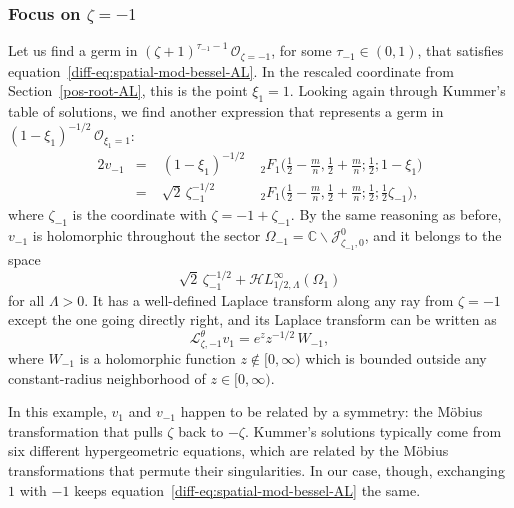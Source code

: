 \documentclass{article}
\newcommand{\singexp}[2]{\mathcal{H}L^\infty_{#1, #2}}
\newcommand{\C}{\mathbb{C}}
\newcommand{\laplace}{\mathcal{L}}
\theoremstyle{definition}
\theoremstyle{plain}
\begin{document}
\subsubsection{Focus on $\zeta = -1$}\label{neg-root-AL}
%
Let us find a germ in $(\zeta+1)^{\tau_{-1}-1}\,\mathcal{O}_{\zeta=-1}$, for some $\tau_{-1} \in (0, 1)$, that satisfies equation~\eqref{diff-eq:spatial-mod-bessel-AL}. In the rescaled coordinate from Section~\ref{pos-root-AL}, this is the point $\xi_1 = 1$. Looking again through Kummer's table of solutions, we find another expression \cite[formula~15.10.14]{dlmf} that represents a germ in $(1-\xi_1)^{-1/2}\,\mathcal{O}_{\xi_1=1}$:
\begin{alignat*}{2}
v_{-1} &=\;& (1-\xi_1)^{-1/2} &\;{}_2F_1\big(\tfrac{1}{2}-\tfrac{m}{n}, \tfrac{1}{2}+\tfrac{m}{n}; \tfrac{1}{2}; 1-\xi_1\big) \\[1mm]
&=\;& \sqrt{2}\,\zeta_{-1}^{-1/2} &\;{}_2F_1\big(\tfrac{1}{2}-\tfrac{m}{n}, \tfrac{1}{2}+\tfrac{m}{n}; \tfrac{1}{2}; \tfrac{1}{2}\zeta_{-1}\big),
\end{alignat*}
where $\zeta_{-1}$ is the coordinate with $\zeta = -1 + \zeta_{-1}$. By the same reasoning as before, $v_{-1}$ is holomorphic throughout the sector $\Omega_{-1} = \C \smallsetminus \mathcal{J}^0_{\zeta_{-1}, 0}$, and it belongs to the space
\[ \sqrt{2}\,\zeta_{-1}^{-1/2} + \singexp{1/2}{\Lambda}(\Omega_1) \]
for all $\Lambda > 0$. It has a well-defined Laplace transform along any ray from $\zeta = -1$ except the one going directly right, and its Laplace transform can be written as
\[ \laplace^\theta_{\zeta, -1} v_1 = e^z z^{-1/2}\,W_{-1}, \]
where $W_{-1}$ is a holomorphic function $z \notin [0, \infty)$ which is bounded outside any constant-radius neighborhood of $z \in [0, \infty)$.


In this example, $v_1$ and $v_{-1}$ happen to be related by a symmetry: the M\"{o}bius transformation that pulls $\zeta$ back to $-\zeta$. Kummer's solutions typically come from six different hypergeometric equations, which are related by the M\"{o}bius transformations that permute their singularities. In our case, though, exchanging $1$ with $-1$ keeps equation~\eqref{diff-eq:spatial-mod-bessel-AL} the same.
\end{document}
